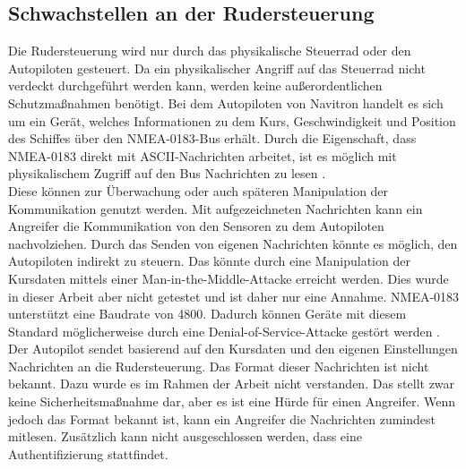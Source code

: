 \subsection{Schwachstellen an der Rudersteuerung}
Die Rudersteuerung wird nur durch das physikalische Steuerrad oder den Autopiloten gesteuert. Da ein physikalischer
Angriff auf das Steuerrad nicht verdeckt durchgeführt werden kann, werden keine außerordentlichen Schutzmaßnahmen benötigt.
Bei dem Autopiloten von Navitron handelt es sich um ein Gerät, welches Informationen zu dem Kurs, Geschwindigkeit und
Position des Schiffes über den NMEA-0183-Bus erhält. Durch die Eigenschaft, dass NMEA-0183 direkt mit ASCII-Nachrichten
arbeitet, ist es möglich mit physikalischem Zugriff auf den Bus Nachrichten zu lesen \cite{nmea0183}. \\
Diese können zur Überwachung oder auch späteren Manipulation der Kommunikation genutzt werden. Mit aufgezeichneten Nachrichten
kann ein Angreifer die Kommunikation von den Sensoren zu dem Autopiloten nachvolziehen. Durch das Senden von eigenen Nachrichten
könnte es möglich, den Autopiloten indirekt zu steuern. Das könnte durch eine Manipulation der Kursdaten mittels einer Man-in-the-Middle-Attacke
erreicht werden. Dies wurde in dieser Arbeit aber nicht getestet und ist daher nur eine Annahme. 
NMEA-0183 unterstützt eine Baudrate von 4800. Dadurch können Geräte mit diesem Standard möglicherweise durch eine 
Denial-of-Service-Attacke gestört werden \cite{Tran2021}.
Der Autopilot sendet basierend auf den Kursdaten und den eigenen Einstellungen Nachrichten an die Rudersteuerung. 
Das Format dieser Nachrichten ist nicht bekannt. Dazu wurde es im Rahmen der Arbeit nicht verstanden.
Das stellt zwar keine Sicherheitsmaßnahme dar, aber es ist eine Hürde für einen Angreifer. Wenn jedoch 
das Format bekannt ist, kann ein Angreifer die Nachrichten zumindest mitlesen. Zusätzlich kann
nicht ausgeschlossen werden, dass eine Authentifizierung stattfindet.\\

